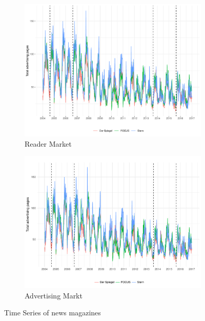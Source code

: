 \documentclass[12pt,a4paper,notitlepage]{article}
\begin{document}
\begin{figure}[H]\centering
 \begin{center}
    \begin{subfigure}[normla]{0.49\textwidth}
        \includegraphics[scale=.5]{figs/sales_fss.pdf}
        \caption{Reader Market}
    \end{subfigure}
    \begin{subfigure}[normla]{0.49\textwidth}
        \includegraphics[scale=.5]{figs/ads_fss.pdf}
        \caption{Advertising Markt}
    \end{subfigure}
 \end{center}
\caption{Time Series of news magazines}

\end{figure}
\end{document}
